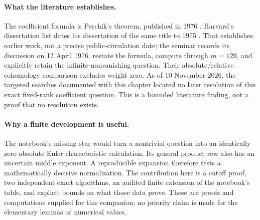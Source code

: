 \paragraph{What the literature establishes.}
The coefficient formula is Perchik's theorem, published in 1976
\citep{perchik1976cohomology}. Harvard's dissertation list dates his
dissertation of the same title to 1975 \citep{perchik1975dissertation}.
That establishes earlier work,
not a precise public-circulation date; the seminar records its discussion
on 12 April 1976. \citet[Theorem~2.1 and the table on Russian pp.~68--69]
{mohammadzadehfuchs2014cohomology} restate the formula, compute through
\(m=129\), and explicitly retain the infinite-nonvanishing question.
Their absolute/relative cohomology comparison excludes weight zero.
As of 10 November 2026, the targeted searches documented with this chapter
located no later resolution of this exact fixed-rank coefficient question.
This is a bounded literature finding, not a proof that no resolution exists.

\paragraph{Why a finite development is useful.}
The notebook's missing star would turn a nontrivial question into an
identically zero absolute Euler-characteristic calculation. Its general
product row also has an uncertain middle exponent. A reproducible expansion
therefore tests a mathematically decisive normalization. The contribution
here is a cutoff proof, two independent exact algorithms, an audited finite
extension of the notebook's table, and explicit bounds on what those data
prove. These are proofs and computations supplied for this companion;
no priority claim is made for the elementary lemmas or numerical values.

